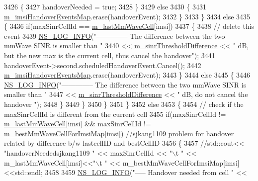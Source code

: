 \begin{DoxyCode}
3426           \{
3427             handoverNeeded = \textcolor{keyword}{true};
3428           \}
3429           \textcolor{keywordflow}{else}
3430           \{
3431             \hyperlink{classns3_1_1LteEnbRrc_a6f703158e9a4ceaccbd1c5df7f5b0ba1}{m\_imsiHandoverEventsMap}.erase(handoverEvent);
3432           \}
3433         \}
3434         \textcolor{keywordflow}{else}
3435         \{
3436           \textcolor{keywordflow}{if}(maxSinrCellId == \hyperlink{classns3_1_1LteEnbRrc_a0d7b04f0383b0dc3f6a7360b87cbaeee}{m\_lastMmWaveCell}[imsi])
3437           \{
3438             \textcolor{comment}{// delete this event}
3439             \hyperlink{group__logging_gafbd73ee2cf9f26b319f49086d8e860fb}{NS\_LOG\_INFO}(\textcolor{stringliteral}{"-------------- The difference between the two mmWave SINR is smaller
       than "} 
3440                   << \hyperlink{classns3_1_1LteEnbRrc_aef56a65c644f6ed3c5f28a540ded624f}{m\_sinrThresholdDifference} << \textcolor{stringliteral}{" dB, but the new max is the
       current cell, thus cancel the handover"});
3441             handoverEvent->second.scheduledHandoverEvent.Cancel();
3442             \hyperlink{classns3_1_1LteEnbRrc_a6f703158e9a4ceaccbd1c5df7f5b0ba1}{m\_imsiHandoverEventsMap}.erase(handoverEvent);
3443           \}
3444           \textcolor{keywordflow}{else}
3445           \{
3446             \hyperlink{group__logging_gafbd73ee2cf9f26b319f49086d8e860fb}{NS\_LOG\_INFO}(\textcolor{stringliteral}{"-------------- The difference between the two mmWave SINR is smaller
       than "} 
3447                   << \hyperlink{classns3_1_1LteEnbRrc_aef56a65c644f6ed3c5f28a540ded624f}{m\_sinrThresholdDifference} << \textcolor{stringliteral}{" dB, do not cancel the handover
      "});
3448           \}
3449         \} 
3450       \}
3451     \}
3452     \textcolor{keywordflow}{else}
3453     \{
3454       \textcolor{comment}{// check if the maxSinrCellId is different from the current cell}
3455       \textcolor{keywordflow}{if}(maxSinrCellId != \hyperlink{classns3_1_1LteEnbRrc_a0d7b04f0383b0dc3f6a7360b87cbaeee}{m\_lastMmWaveCell}[imsi] && maxSinrCellId != 
      \hyperlink{classns3_1_1LteEnbRrc_a38d5bf3d53b16596824f07d4b4a1eab7}{m\_bestMmWaveCellForImsiMap}[imsi]) \textcolor{comment}{//sjkang1109 problem for handover related by
       difference b/w lastcellID and bestCellID}
3456       \{
3457         \textcolor{comment}{//std::cout<< "handoverNeededsjkang1109 " << maxSinrCellId << "\(\backslash\)t  " << m\_lastMmWaveCell[imsi]<<"\(\backslash\)t
       " << m\_bestMmWaveCellForImsiMap[imsi] <<std::endl;}
3458 
3459           \hyperlink{group__logging_gafbd73ee2cf9f26b319f49086d8e860fb}{NS\_LOG\_INFO}(\textcolor{stringliteral}{"----- Handover needed from cell "} << 

\end{DoxyCode}
